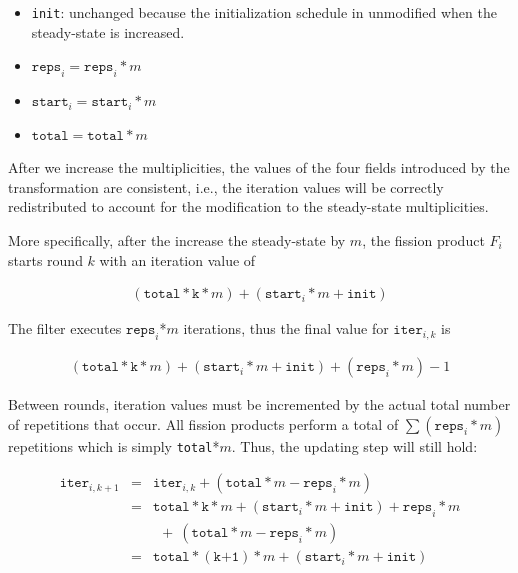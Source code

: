 \begin{itemize}
    \item \texttt{init}: unchanged because the initialization schedule
      in unmodified when the steady-state is increased.
    \item $\texttt{reps}_i = \texttt{reps}_i * m $
    \item $\texttt{start}_i = \texttt{start}_i * m$
    \item $\texttt{total} = \texttt{total} * m$
\end{itemize}

After we increase the multiplicities, the values of the four fields
introduced by the transformation are consistent, i.e., the iteration
values will be correctly redistributed to account for the modification
to the steady-state multiplicities.  

More specifically, after the increase the steady-state by $m$, the
fission product $F_i$ starts round $k$ with an iteration value of

\begin{eqnarray*}
(\texttt{total}*\texttt{k}*m) + (\texttt{start}_i*m + \texttt{init})
\end{eqnarray*}

The filter executes $\texttt{reps}_i$*$m$ iterations, thus the final
value for $\texttt{iter}_{i,k}$ is 

\begin{eqnarray*}
(\texttt{total}*\texttt{k}*m) + (\texttt{start}_i*m + \texttt{init}) + (\texttt{reps}_i*m) - 1
\end{eqnarray*}

Between rounds, iteration values must be incremented by the actual
total number of repetitions that occur.  All fission products perform
a total of $\sum(\texttt{reps}_{i}*m)$ repetitions which is simply
\texttt{total}*$m$.  Thus, the updating step will still hold:

\begin{eqnarray*}
\texttt{iter}_{i,k+1} &=& \texttt{iter}_{i,k} + (\texttt{total}*m - \texttt{reps}_i*m) \\
&=& \texttt{total}*\texttt{k}*m + (\texttt{start}_i*m + \texttt{init}) + \texttt{reps}_i*m \\
&&  \ \ +\ (\texttt{total}*m - \texttt{reps}_i*m) \\
&=& \texttt{total}*(\texttt{k+1})*m + (\texttt{start}_i*m + \texttt{init})
\end{eqnarray*}


